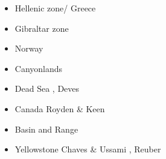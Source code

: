 \begin{itemize}
\item Hellenic zone/ Greece  
{\scriptsize
\cite{spwv88}
\cite{guhf13}
\cite{olpr14}
}
\item Gibraltar zone 
{\scriptsize
\cite{gumr02}\cite{nebs02}
\cite{vanv08}
\cite{fufa10}
\cite{miab13}\cite{almb13}
\cite{medd15}\cite{furc15}
\cite{necf16}
\cite{casv19}
\cite{jitf19}
} 
\item Norway 
{\scriptsize
\cite{soma13}
\cite{bubj15}
}
\item Canyonlands 
{\scriptsize
\cite{trca94}
\cite{scwa02}
\cite{grsk03}
}
\item Dead Sea 
{\scriptsize
\cite{sopg05},
Deves \etal \cite{dekk11}
}
\item Canada 
{\scriptsize
Royden \& Keen \cite{roke80}
\cite{brbw93}
\cite{pelj99}
}
\item Basin and Range 
{\scriptsize
\cite{brbe89c}
\cite{wefr09}
}
\item Yellowstone 
{\scriptsize
Chaves \& Ussami \cite{chus13},
Reuber \etal \cite{rekp18}
}


\end{itemize}
